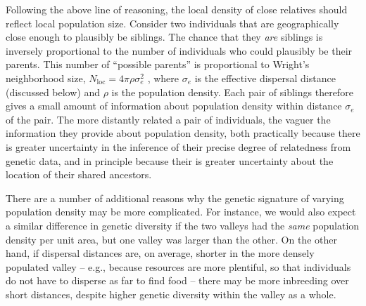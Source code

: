 \documentclass{ar-1col}
\begin{document}
Following the above line of reasoning,
the local density of close relatives 
should reflect local population size.
Consider two individuals that are geographically close enough to plausibly be siblings.
The chance that they \textit{are} siblings is inversely proportional to
the number of individuals who could plausibly be their parents.
This number of ``possible parents'' is proportional to
Wright's neighborhood size, $N_\text{loc} = 4 \pi \rho \sigma_e^2$ \citep{wright1946isolation},
where $\sigma_e$ is the effective dispersal distance (discussed below)
and $\rho$ is the population density.
Each pair of siblings therefore gives a small amount of information
about population density within distance $\sigma_e$ of the pair.
The more distantly related a pair of individuals, 
the vaguer the information they provide about population density,
both practically because there is greater uncertainty 
in the inference of their precise degree of relatedness from genetic data,
and in principle because their is greater uncertainty about the location 
of their shared ancestors.

There are a number of additional reasons why the genetic signature 
of varying population density may be more complicated.
For instance, we would also expect a similar difference in genetic diversity
if the two valleys had the \textit{same} population density per unit area,
but one valley was larger than the other.
On the other hand, if dispersal distances are, on average, shorter 
in the more densely populated valley -- 
e.g., because resources are more plentiful, 
so that individuals do not have to disperse as far to find food -- 
there may be more inbreeding over short distances,
despite higher genetic diversity within the valley as a whole.

\end{document}
